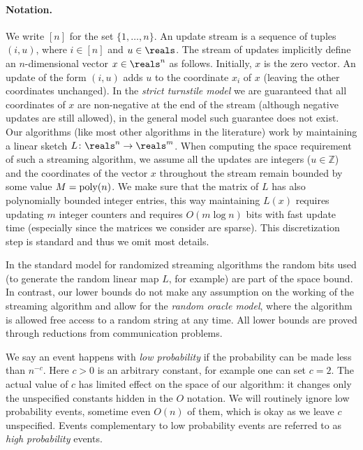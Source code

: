 \paragraph{Notation.}
We write $[n]$ for the set $\{1,\ldots,n\}$. An update stream is
a sequence of tuples $(i,u)$, where $i\in [n]$ and $u\in\reals$.
The stream of updates implicitly define an $n$-dimensional
vector $x\in\reals^n$ as follows. Initially, $x$ is the zero
vector. An update of the form $(i,u)$ adds $u$ to the coordinate
$x_i$ of $x$ (leaving the other coordinates unchanged). In the
{\em strict turnstile model} we are guaranteed that all
coordinates of $x$ are non-negative at the end of the stream
(although negative updates are still allowed), in the general
model such guarantee does not exist. Our algorithms (like most
other algorithms in the literature) work by maintaining a linear
sketch $L\colon\reals^n\to\reals^m$. When computing the space
requirement of such a streaming algorithm, we assume all the
updates are integers ($u\in\mathbb Z$) and the coordinates of
the vector $x$ throughout the stream remain bounded by some
value $M=\operatorname{poly}(n)$. We make sure that the matrix of $L$ has also
polynomially bounded integer entries, this way maintaining
$L(x)$ requires updating $m$ integer counters and requires
$O(m\log n)$ bits with fast update time (especially since the
matrices we consider are sparse). This discretization step is
standard and thus we omit most details.

In the standard model for randomized streaming algorithms the
random bits used (to generate the random linear map $L$, for
example) are part of the space bound. In contrast, our lower
bounds do not make any assumption on the working of the
streaming algorithm and allow for the {\em random oracle model},
where the algorithm is allowed free access to a random string at
any time. All lower bounds are proved through reductions from
communication problems.

We say an event happens with {\em low probability} if the
probability can be made less than $n^{-c}$. Here $c>0$ is an
arbitrary constant, for example one can set $c=2$. The actual
value of $c$ has limited effect on the space of our algorithm:
it changes only the unspecified constants hidden in the $O$
notation. We will routinely ignore low probability events,
sometime even $O(n)$ of them, which is okay as we leave $c$
unspecified. Events complementary to low probability events are
referred to as {\em high probability} events.

